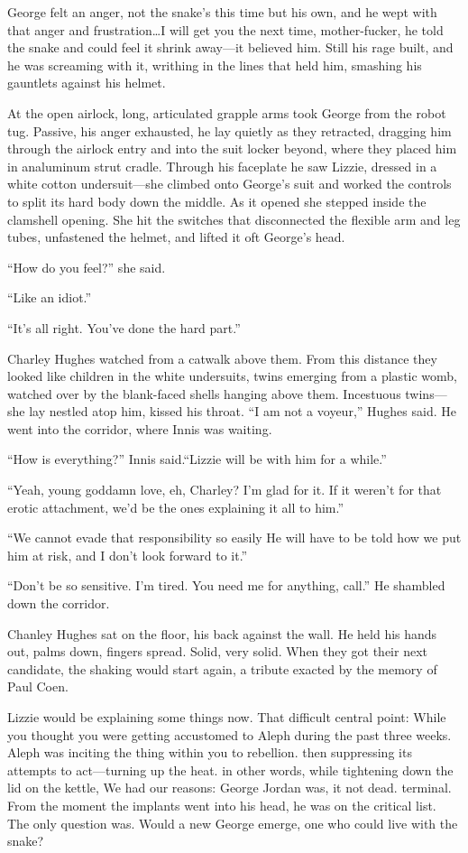 George felt an anger, not the snake's this time but his own, and he wept with that anger and frustration\ldots I will get you the next time, mother-fucker, he told the snake and could feel it shrink away—it believed him. Still his rage built, and he was screaming with it, writhing in the lines that held him, smashing his gauntlets against his helmet.

At the open airlock, long, articulated grapple arms took George from the robot tug. Passive, his anger exhausted, he lay quietly as they retracted, dragging him through the airlock entry and into the suit locker beyond, where they placed him in analuminum strut cradle. Through his faceplate he saw Lizzie, dressed in a white cotton undersuit—she climbed onto George's suit and worked the controls to split its hard body down the middle. As it opened she stepped inside the clamshell opening. She hit the switches that disconnected the flexible arm and leg tubes, unfastened the helmet, and lifted it oft George's head.

``How do you feel?'' she said.

``Like an idiot.''

``It's all right. You've done the hard part.''

Charley Hughes watched from a catwalk above them. From this distance they looked like children in the white undersuits, twins emerging from a plastic womb, watched over by the blank-faced shells hanging above them. Incestuous twins—she lay nestled atop him, kissed his throat. ``I am not a voyeur,'' Hughes said. He went into the corridor, where Innis was waiting.

``How is everything?'' Innis said.``Lizzie will be with him for a while.''

``Yeah, young goddamn love, eh, Charley? I'm glad for it. If it weren't for that erotic attachment, we'd be the ones explaining it all to him.''

``We cannot evade that responsibility so easily He will have to be told how we put him at risk, and I don't look forward to it.''

``Don't be so sensitive. I'm tired. You need me for anything, call.'' He shambled down the corridor.

Chanley Hughes sat on the floor, his back against the wall. He held his hands out, palms down, fingers spread. Solid, very solid. When they got their next candidate, the shaking would start again, a tribute exacted by the 
memory of Paul Coen.

Lizzie would be explaining some things now. That difficult central point: While you thought you were getting accustomed to Aleph during the past three weeks. Aleph was inciting the thing within you to rebellion. then suppressing its attempts to act—turning up the heat. in other words, while tightening down the lid on the kettle, We had our reasons: George Jordan was, it not dead. terminal. From the moment the implants went into his head, he was on the critical list. The only question was. Would a new George emerge, one who could live with the snake?


